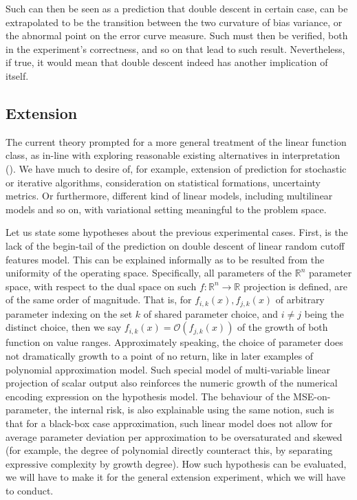 Such can then be seen as a prediction that double descent in certain case, can be extrapolated to be the transition between the two curvature of bias variance, or the abnormal point on the error curve measure. Such must then be verified, both in the experiment's correctness, and so on that lead to such result. Nevertheless, if true, it would mean that double descent indeed has another implication of itself. 

\subsection{Extension}

The current theory prompted for a more general treatment of the linear function class, as in-line with exploring reasonable existing alternatives in interpretation (\cite{nakkiran2019datahurtlinearregression}). We have much to desire of, for example, extension of prediction for stochastic or iterative algorithms, consideration on statistical formations, uncertainty metrics. Or furthermore, different kind of linear models, including multilinear models and so on, with variational setting meaningful to the problem space. 

Let us state some hypotheses about the previous experimental cases. First, is the lack of the begin-tail of the prediction on double descent of linear random cutoff features model. This can be explained informally as to be resulted from the uniformity of the operating space. Specifically, all parameters of the $\mathbb{R}^{n}$ parameter space, with respect to the dual space on such $f:\mathbb{R}^{n}\to\mathbb{R}$ projection is defined, are of the same order of magnitude. That is, for $f_{i,k}(x),f_{j,k}(x)$ of arbitrary parameter indexing on the set $k$ of shared parameter choice, and $i\neq j$ being the distinct choice, then we say $f_{i,k}(x)=\mathcal{O}(f_{j,k}(x))$ of the growth of both function on value ranges. Approximately speaking, the choice of parameter does not dramatically growth to a point of no return, like in later examples of polynomial approximation model. Such special model of multi-variable linear projection of scalar output also reinforces the numeric growth of the numerical encoding expression on the hypothesis model. The behaviour of the MSE-on-parameter, the internal risk, is also explainable using the same notion, such is that for a black-box case approximation, such linear model does not allow for average parameter deviation per approximation to be oversaturated and skewed (for example, the degree of polynomial directly counteract this, by separating expressive complexity by growth degree). How such hypothesis can be evaluated, we will have to make it for the general extension experiment, which we will have to conduct. 

